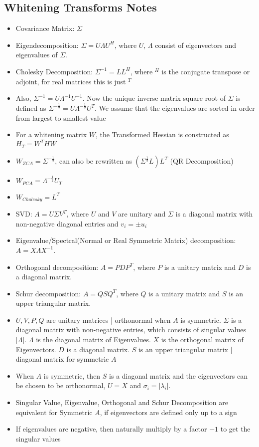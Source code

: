 \subsection{Whitening Transforms Notes}

\begin{itemize}

\item Covariance Matrix: $\Sigma$
\item Eigendecomposition: $\Sigma = U\Lambda U^{H}$, where $U$,  $\Lambda$ consist of eigenvectors and eigenvalues of $\Sigma$.
\item Cholesky Decomposition: $\Sigma^{-1} = LL^{H}$, where $^{H}$ is the conjugate transpose or adjoint, for real matrices this is just $^{T}$
\item Also, $\Sigma^{-1} = U \Lambda^{-1} U^{-1}$. Now the unique inverse matrix square root of $\Sigma$ is defined as  $\Sigma^{-\frac{1}{2}} = U\Lambda^{-\frac{1}{2}}U^{T}$. We assume that the eigenvalues are sorted in order from largest to smallest value
\item For a whitening matrix $W$, the Transformed Hessian is constructed as $H_{T} = W^{T}HW$
\item $W_{ZCA} = \Sigma^{-\frac{1}{2}}$, can also be rewritten as $(\Sigma^{\frac{1}{2}} L) L^{T}$ (QR Decomposition)
\item $W_{PCA} = \Lambda^{-\frac{1}{2}}U_{T}$
\item $W_{Cholesky} = L^{T}$
\item SVD: $A=U \Sigma V^T$, where $U$ and $V$ are unitary and $\Sigma$ is a diagonal matrix with non-negative diagonal entries and $v_i= \pm u_i$
\item Eigenvalue/Spectral(Normal or Real Symmetric Matrix) decomposition: $A=X \Lambda X^{-1}$.
\item Orthogonal decomposition: $A=P D P^T$, where $P$ is a unitary matrix and $D$ is a diagonal matrix.
\item Schur decomposition: $A=Q S Q^T$, where $Q$ is a unitary matrix and $S$ is an upper triangular matrix.
\item $U, V, P, Q$ are unitary matrices | orthonormal when $A$ is symmetric. $\Sigma$ is a diagonal matrix with non-negative entries, which consists of singular values $|\Lambda|$. $\Lambda$ is the diagonal matrix of Eigenvalues. $X$ is the orthogonal matrix of Eigenvectors. $D$ is a diagonal matrix. $S$ is an upper triangular matrix | diagonal matrix for symmetric $A$
\item When $A$ is symmetric, then $S$ is a diagonal matrix and the eigenvectors can be chosen to be orthonormal, $U=X$ and $\sigma_i=\left|\lambda_i\right|$.
\item Singular Value, Eigenvalue, Orthogonal and Schur Decomposition are equivalent for Symmetric $A$, if eigenvectors are defined only up to a sign
\item If eigenvalues are negative, then naturally multiply by a factor  $-1$ to get the singular values
\end{itemize}